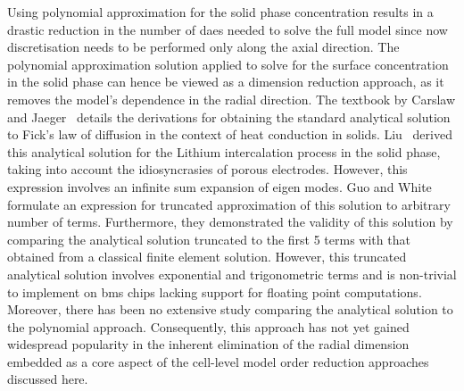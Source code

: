 Using polynomial  approximation for the  solid phase concentration results  in a
drastic reduction  in the number of  \glspl{dae} needed to solve  the full model
since now discretisation  needs to be performed only along  the axial direction.
The  polynomial  approximation  solution  applied   to  solve  for  the  surface
concentration in  the solid phase can  hence be viewed as  a dimension reduction
approach, as  it removes  the model's  dependence in  the radial  direction. The
textbook by  Carslaw and  Jaeger~\cite{Carslaw1947} details the  derivations for
obtaining the  standard analytical solution  to Fick's  law of diffusion  in the
context of heat conduction in solids. Liu~\cite{Liu2006} derived this analytical
solution for the  Lithium intercalation process in the solid  phase, taking into
account  the idiosyncrasies  of porous  electrodes. However, this  expression involves an  infinite sum
expansion of eigen  modes. Guo and White~\cite{Guo2012}  formulate an expression
for  truncated approximation  of this  solution  to arbitrary  number of  terms.
Furthermore, they  demonstrated the validity  of this solution by  comparing the
analytical solution  truncated to the  first 5 terms  with that obtained  from a
classical finite  element solution. However, this  truncated analytical solution
involves exponential and trigonometric terms  and is non-trivial to implement on
\gls{bms} chips lacking support for floating point computations. Moreover, there
has been no extensive study comparing  the analytical solution to the polynomial
approach. Consequently, this  approach has not yet  gained widespread popularity
in the inherent elimination of the radial dimension embedded as a core aspect of
the cell-level  model order reduction approaches  discussed here.


